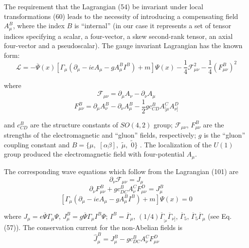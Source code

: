 \documentclass[a4paper,12pt]{article}
\begin{document}
The requirement that the Lagrangian (54) be invariant under local
transformations (60) leads to the necessity of introducing a compensating
field $A_\mu ^B$, where the index $B$ is ``internal'' (in our case it
represents a set of tensor indices specifying a scalar, a four-vector, a
skew second-rank tensor, an axial four-vector and a pseudoscalar). The gauge
invariant Lagrangian has the known form:
\begin{equation}
\mathcal{L}=-\overline{\Psi }(x)\left[ \Gamma _\mu \left( \partial _\mu
-ieA_\mu -gA_\mu ^BI^B\right) +m\right] \Psi (x)-\frac 14\mathcal{F}_{\mu
\nu }^2-\frac 14\left( F_{\mu \nu }^B\right) ^2  \label{101}
\end{equation}

where
\[
\mathcal{F}_{\mu \nu }=\partial _\mu A_\nu -\partial _\nu A_\mu
\]
\begin{equation}
F_{\mu \nu }^B=\partial _\mu A_\nu ^B-\partial _\nu A_\mu ^B-\frac
12gc_{CD}^BA_{[\mu }^CA_{\nu ]}^D  \label{102}
\end{equation}

and $c_{CD}^B$ are the structure constants of $SO(4,2)$ group;
$\mathcal{F} _{\mu \nu }$, $F_{\mu \nu }^B$ are the strengths of
the electromagnetic and ``gluon'' fields, respectively; $g$ is the
``gluon'' coupling constant and $ B=\{\mu ,$ $[\alpha \beta ],$
$\widetilde{\mu },$ $\widetilde{0}\}$ . The localization of the
$U(1)$ group produced the electromagnetic field with
four-potential $A_\mu $.

The corresponding wave equations which follow from the Lagrangian (101) are
\begin{equation}
\partial _\nu \mathcal{F}_{\mu \nu }=J_\mu  \label{103}
\end{equation}
\begin{equation}
\partial _\nu F_{\mu \nu }^B+gc_{DC}^BA_\nu ^CF_{\mu \nu }^D=J_\mu ^B
\label{104}
\end{equation}
\begin{equation}
\left[ \Gamma _\mu \left( \partial _\mu -ieA_\mu -gA_\mu ^BI^B\right)
+m\right] \Psi (x)=0  \label{105}
\end{equation}

where $J_\mu =e\overline{\Psi }\Gamma _\mu \Psi $, $J_\mu
^B=g\overline{\Psi }\Gamma _\mu I^B\Psi $; $I^B=\overline{\Gamma
}_\mu $, $(1/4)\overline{ \Gamma }_{_{[\mu }}\overline{\Gamma
}_{\nu ]}$, $\overline{\Gamma }_5$, $ \overline{\Gamma
}_5\overline{\Gamma }_\mu $ (see Eq. (57)). The conservation
current for the non-Abelian fields is
\begin{equation}
\widehat{J}_\mu ^B=J_\mu ^B-gc_{DC}^BA_\nu ^CF_{\mu \nu }^D  \label{106}
\end{equation}
\end{document}
